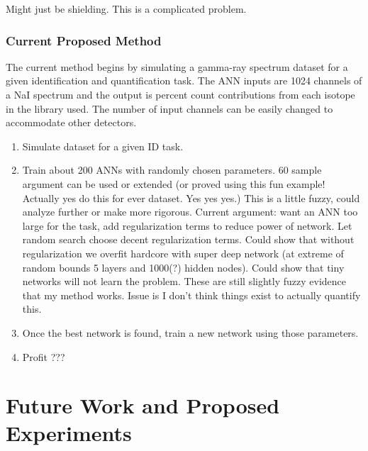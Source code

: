 \documentclass[thesis,tocnosub,noragright,centerchapter,12pt,fullpage]{uiucecethesis09}
\begin{document}
Might just be shielding. This is a complicated problem. 

\subsection{Current Proposed Method}


The current method begins by simulating a gamma-ray spectrum dataset for a given identification and quantification task. The ANN inputs are 1024 channels of a NaI spectrum and the output is percent count contributions from each isotope in the library used. The number of input channels can be easily changed to accommodate other detectors. 

\begin{enumerate}
    \item Simulate dataset for a given ID task. 
  
    \item Train about 200 ANNs with randomly chosen parameters. 60 sample argument can be used or extended (or proved using this fun example! Actually yes do this for ever dataset. Yes yes yes.)
    \subitem This is a little fuzzy, could analyze further or make more rigorous.
    \subitem Current argument: want an ANN too large for the task, add regularization terms to reduce power of network. Let random search choose decent regularization terms. 
    \subsubitem Could show that without regularization we overfit hardcore with super deep network (at extreme of random bounds 5 layers and 1000(?) hidden nodes). 
    \subsubitem Could show that tiny networks will not learn the problem.
    \subsubitem These are still slightly fuzzy evidence that my method works. Issue is I don't think things exist to actually quantify this.

    \item Once the best network is found, train a new network using those parameters.
    
    \item Profit ???









\end{enumerate}





\chapter{Future Work and Proposed Experiments}
\end{document}
